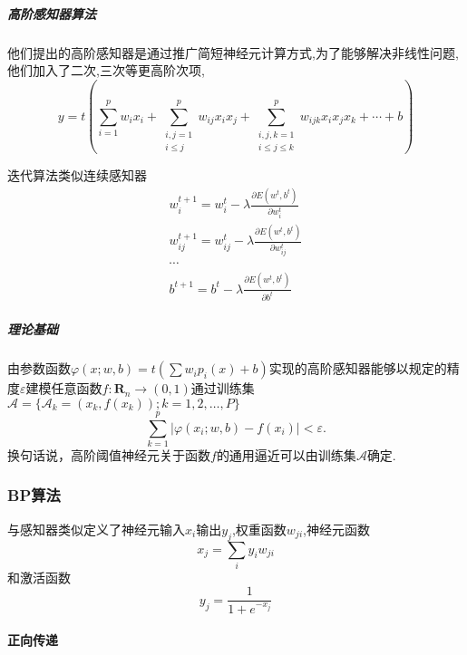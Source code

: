 \subparagraph{高阶感知器算法}





他们提出的高阶感知器是通过推广简短神经元计算方式,为了能够解决非线性问题,他们加入了二次,三次等更高阶次项,
\[y = t\left( \sum_{i=1}^p w_i x_i + \sum_{\substack{i,j = 1 \\ i\leq j}}^p w_{ij} x_i x_j +
    \sum_{\substack{i,j,k = 1 \\ i \leq j \leq k}}^p w_{ijk} x_i x_j x_k + \cdots + b \right)\]

迭代算法类似连续感知器
\begin{align*}
  w_i^{t+1} = w_i^{t} - \lambda \frac{\partial E(w^{t}, b^t)}{\partial w^t_i} \\
  w_{ij}^{t+1} = w_{ij}^t - \lambda \frac{\partial E(w^{t}, b^t)}{\partial w^t_{ij}} \\
  \cdots \\
  b^{t+1} = b^t - \lambda \frac{\partial E(w^{t}, b^t)}{\partial b^t}
\end{align*}

\subparagraph{理论基础}

\begin{thm}
  由参数函数$\varphi(x; w, b) = t (\sum w_i p_i(x) + b)$实现的高阶感知器能够以规定的精度$\varepsilon$建模任意函数$f\colon \mathbf{R}_n \rightarrow (0,1) $通过训练集$\mathcal{A} = \{\mathcal{A}_k = (x_k, f(x_k)); k = 1,2,\ldots,P\}$
  \[ \sum_{k=1}^p \left| \varphi(x_i; w, b) - f(x_i) \right| < \varepsilon.\]
  换句话说，高阶阈值神经元关于函数$f$的通用逼近可以由训练集$\mathcal{A}$确定.
\end{thm}




\subsubsection{BP算法\cite{Rumelhart1986}}

与感知器类似定义了神经元输入$x_i$输出$y_j$,权重函数$w_{ji}$,神经元函数
\begin{equation}
  \label{eq:bp1}
  x_j = \sum_i y_i w_{ji} 
\end{equation}
和激活函数
\begin{equation}
  \label{eq:bp2}
  y_j = \frac{1}{1 + e^{-x_j}}
\end{equation}

\paragraph{正向传递}

